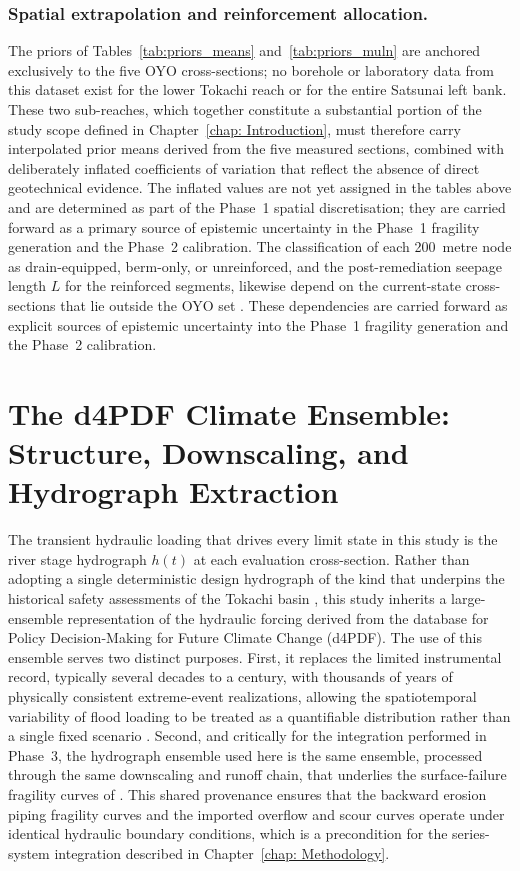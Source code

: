 \subsubsection*{Spatial extrapolation and reinforcement allocation.}
The priors of Tables~\ref{tab:priors_means} and~\ref{tab:priors_muln} are anchored exclusively to the five OYO cross-sections; no borehole or laboratory data from this dataset exist for the lower Tokachi reach or for the entire Satsunai left bank. These two sub-reaches, which together constitute a substantial portion of the study scope defined in Chapter~\ref{chap: Introduction}, must therefore carry interpolated prior means derived from the five measured sections, combined with deliberately inflated coefficients of variation that reflect the absence of direct geotechnical evidence. The inflated values are not yet assigned in the tables above and are determined as part of the Phase~1 spatial discretisation; they are carried forward as a primary source of epistemic uncertainty in the Phase~1 fragility generation and the Phase~2 calibration. The classification of each 200~metre node as drain-equipped, berm-only, or unreinforced, and the post-remediation seepage length $L$ for the reinforced segments, likewise depend on the current-state cross-sections that lie outside the OYO set \parencite{fukuda_2025_internal}. These dependencies are carried forward as explicit sources of epistemic uncertainty into the Phase~1 fragility generation and the Phase~2 calibration.

\section{The d4PDF Climate Ensemble: Structure, Downscaling, and Hydrograph Extraction}
\label{sec: The d4PDF Climate Ensemble: Structure, Downscaling, and Hydrograph Extraction}

The transient hydraulic loading that drives every limit state in this study is the river stage hydrograph $h(t)$ at each evaluation cross-section. Rather than adopting a single deterministic design hydrograph of the kind that underpins the historical safety assessments of the Tokachi basin \parencite{oyo_1999}, this study inherits a large-ensemble representation of the hydraulic forcing derived from the database for Policy Decision-Making for Future Climate Change (d4PDF). The use of this ensemble serves two distinct purposes. First, it replaces the limited instrumental record, typically several decades to a century, with thousands of years of physically consistent extreme-event realizations, allowing the spatiotemporal variability of flood loading to be treated as a quantifiable distribution rather than a single fixed scenario \parencite{mizuta_2017}. Second, and critically for the integration performed in Phase~3, the hydrograph ensemble used here is the same ensemble, processed through the same downscaling and runoff chain, that underlies the surface-failure fragility curves of \textcite{uemura_phd_2025}. This shared provenance ensures that the backward erosion piping fragility curves and the imported overflow and scour curves operate under identical hydraulic boundary conditions, which is a precondition for the series-system integration described in Chapter~\ref{chap: Methodology}.

